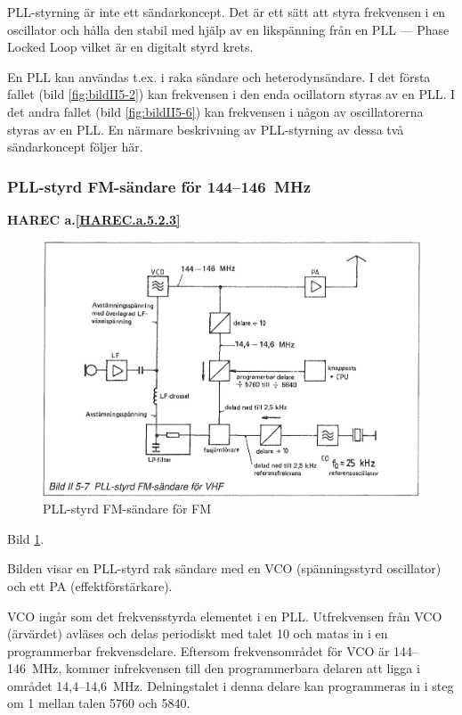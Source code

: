 PLL-styrning är inte ett sändarkoncept. Det är ett sätt att styra
frekvensen i en oscillator och hålla den stabil med hjälp av en
likspänning från en PLL --- Phase Locked Loop vilket är en digitalt
styrd krets.

En PLL kan användas t.ex. i raka sändare och heterodynsändare. I det
första fallet (bild \ref{fig:bildII5-2}) kan frekvensen i den enda ocillatorn
styras av en PLL. I det andra fallet (bild \ref{fig:bildII5-6}) kan frekvensen i
någon av oscillatorerna styras av en PLL.  En närmare beskrivning av
PLL-styrning av dessa två sändarkoncept följer här.

\subsubsection{PLL-styrd FM-sändare för 144--146~MHz}
\textbf{
HAREC a.\ref{HAREC.a.5.2.3}\label{myHAREC.a.5.2.3}
}

\begin{figure}
  \includegraphics[width=\textwidth]{images/bild_2_5-07}
  \caption{PLL-styrd FM-sändare för FM}
  \label{fig:bildII5-7}
\end{figure}

Bild \ref{fig:bildII5-7}.

Bilden visar en PLL-styrd rak sändare med en VCO (spänningsstyrd
oscillator) och ett PA (effektförstärkare).

VCO ingår som det frekvensstyrda elementet i en PLL. Utfrekvensen från
VCO (ärvärdet) avläses och delas periodiskt med talet 10 och matas in
i en programmerbar frekvensdelare. Eftersom frekvensområdet för VCO är
144--146~MHz, kommer infrekvensen till den programmerbara delaren att
ligga i området 14,4--14,6~MHz. Delningstalet i denna delare kan
programmeras in i steg om 1 mellan talen 5760 och 5840.

